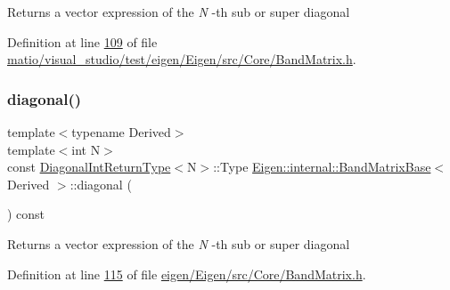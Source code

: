 \begin{DoxyReturn}{Returns}
a vector expression of the {\itshape N} -\/th sub or super diagonal 
\end{DoxyReturn}


Definition at line \hyperlink{matio_2visual__studio_2test_2eigen_2_eigen_2src_2_core_2_band_matrix_8h_source_l00109}{109} of file \hyperlink{matio_2visual__studio_2test_2eigen_2_eigen_2src_2_core_2_band_matrix_8h_source}{matio/visual\+\_\+studio/test/eigen/\+Eigen/src/\+Core/\+Band\+Matrix.\+h}.

\mbox{\label{class_eigen_1_1internal_1_1_band_matrix_base_aa8a5c997afb4ebd9b43b9ff2e1078cf9}} 
\subsubsection{\texorpdfstring{diagonal()}{diagonal()}\hspace{0.1cm}{\footnotesize\ttfamily [7/12]}}
{\footnotesize\ttfamily template$<$typename Derived$>$ \\
template$<$int N$>$ \\
const \hyperlink{struct_eigen_1_1internal_1_1_band_matrix_base_1_1_diagonal_int_return_type}{Diagonal\+Int\+Return\+Type}$<$N$>$\+::Type \hyperlink{class_eigen_1_1internal_1_1_band_matrix_base}{Eigen\+::internal\+::\+Band\+Matrix\+Base}$<$ Derived $>$\+::diagonal (\begin{DoxyParamCaption}{ }\end{DoxyParamCaption}) const\hspace{0.3cm}{\ttfamily [inline]}}

\begin{DoxyReturn}{Returns}
a vector expression of the {\itshape N} -\/th sub or super diagonal 
\end{DoxyReturn}


Definition at line \hyperlink{eigen_2_eigen_2src_2_core_2_band_matrix_8h_source_l00115}{115} of file \hyperlink{eigen_2_eigen_2src_2_core_2_band_matrix_8h_source}{eigen/\+Eigen/src/\+Core/\+Band\+Matrix.\+h}.

\mbox{\label{class_eigen_1_1internal_1_1_band_matrix_base_aa8a5c997afb4ebd9b43b9ff2e1078cf9}} 
